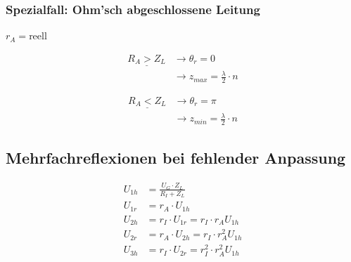\subsubsection{Spezialfall: Ohm'sch abgeschlossene Leitung}
\begin{center}
    $r_A = $reell
\end{center}

\begin{align*}
    \underline{R_A > Z_L} & \rightarrow\theta_r = 0                      \\
                          & \rightarrow z_{max}=\frac{\lambda}{2}\cdot n
\end{align*}

\begin{align*}
    \underline{R_A < Z_L} & \rightarrow\theta_r = \pi                    \\
                          & \rightarrow z_{min}=\frac{\lambda}{2}\cdot n
\end{align*}

\subsection{Mehrfachreflexionen bei fehlender Anpassung}


\begin{align*}
    U_{1h} & = \frac{U_G\cdot Z_L}{R_I + Z_L}            \\
    U_{1r} & = r_A\cdot U_{1h}                           \\
    U_{2h} & = r_I\cdot U_{1r} = r_I\cdot r_A U_{1h}     \\
    U_{2r} & = r_A\cdot U_{2h} = r_I\cdot r_A^2 U_{1h}   \\
    U_{3h} & = r_I\cdot U_{2r} = r_I^2\cdot r_A^2 U_{1h}
\end{align*}

